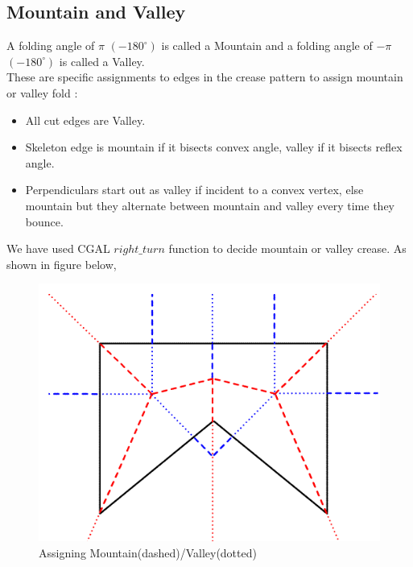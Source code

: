 \documentclass[11pt]{article}
\begin{document}
\subsection{Mountain and Valley}
A folding angle of $\pi$
$(-180^\circ)$ is called a Mountain and a folding angle of $-\pi$ $(-180^\circ)$ is called a Valley.\\
These are specific assignments to edges in the crease pattern to assign mountain or valley fold \cite{MV}:
\begin{itemize}
  \item All cut edges are Valley.
  \item Skeleton edge is mountain if it bisects convex angle, valley if it bisects reflex angle.
  \item Perpendiculars start out as valley if incident to a convex vertex, else mountain but they alternate between mountain and valley every time they bounce.
\end{itemize}
We have used CGAL $right\_turn$ function to decide mountain or valley crease. As shown in figure below, \cite{biunno}
\begin{figure}[H]
\centering
\includegraphics[width=.5\textwidth]{FIGS/Part2/mv}
\caption{Assigning Mountain(dashed)/Valley(dotted)}
\label{fig:mv}
\end{figure}
\end{document}

